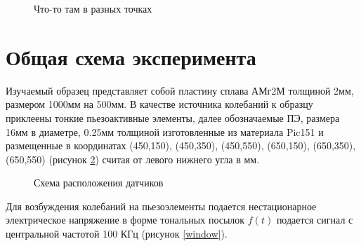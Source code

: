 \documentclass[a4paper, 12pt]{article}
\begin{document}
    \begin{figure}[h]   
        \caption{Что-то там в разных точках}
        \label{act3}
    \end{figure}



\section{Общая схема эксперимента}
Изучаемый образец представляет собой пластину сплава АМг2М толщиной 2мм, размером 1000мм на 500мм. В качестве источника колебаний к образцу приклеены тонкие пьезоактивные элементы, далее обозначаемые ПЭ, размера 16мм в диаметре, 0.25мм толщиной изготовленные из материала Pic151 и размещенные в координатах (450,150), (450,350), (450,550), (650,150), (650,350), (650,550) (рисунок \ref{dats}) считая от левого нижнего угла в мм.
\begin{figure}[h]
    \caption{Схема расположения датчиков}
    \label{dats}
\end{figure}
Для возбуждения колебаний на пьезоэлементы подается нестационарное электрическое напряжение в форме тональных посылок $f(t)$ подается сигнал с центральной частотой 100 КГц (рисунок \ref{window}).
\end{document}
